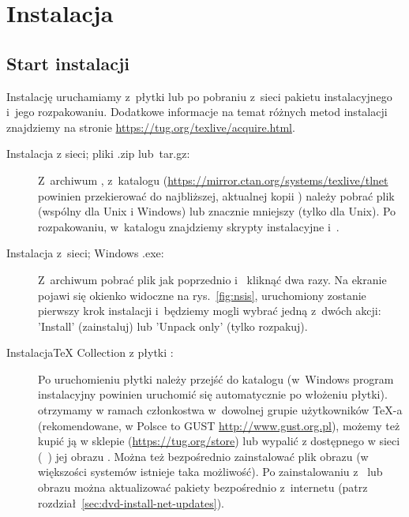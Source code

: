 \documentclass{article}
\begin{document}
\section{Instalacja}
\label{sec:install}

\subsection{Start instalacji}
\label{sec:inst-start}

Instalację \TL{} uruchamiamy z~płytki \TK{} \DVD{} lub po pobraniu z~sieci
pakietu instalacyjnego i~jego rozpakowaniu.
Dodatkowe informacje na temat różnych metod instalacji znajdziemy
na stronie \url{https://tug.org/texlive/acquire.html}.

\begin{description}
\item [Instalacja z sieci; pliki .zip lub~tar.gz:] Z~archiwum \CTAN, z~katalogu
(\url{https://mirror.ctan.org/systems/texlive/tlnet} powinien
przekierować do najbliższej, aktualnej kopii \CTAN) należy pobrać plik
 (wspólny dla Unix i Windows) lub znacznie mniejszy
 (tylko dla Unix). Po rozpakowaniu,
w~katalogu  znajdziemy skrypty instalacyjne
 i~.

\item [Instalacja z~sieci; Windows .exe:]
Z~archiwum \CTAN{}   pobrać plik jak poprzednio i~ kliknąć dwa razy. Na ekranie pojawi się okienko  widoczne na rys.~\ref{fig:nsis},  uruchomiony zostanie pierwszy krok instalacji  i~będziemy mogli wybrać jedną z~dwóch akcji: 'Install' (zainstaluj) lub 'Unpack only' (tylko rozpakuj).


\item [Instalacja\TeX{} Collection z płytki  \DVD:] Po uruchomieniu
płytki należy przejść do katalogu    \DVD{}
(w~Windows program instalacyjny powinien uruchomić się  automatycznie po włożeniu płytki).
\DVD{} otrzymamy w ramach członkostwa w~dowolnej grupie użytkowników
  \TeX-a (rekomendowane, w Polsce to GUST  \url{http://www.gust.org.pl}), możemy też kupić ją  w sklepie (\url{https://tug.org/store})
 lub  wypalić  z dostępnego w sieci (\CTAN\ ) jej obrazu \ISO{}. Można też 
bezpośrednio zainstalować plik obrazu (w większości systemów istnieje taka możliwość). Po
zainstalowaniu z \DVD\ lub obrazu \ISO{} można aktualizować pakiety
bezpośrednio z~internetu (patrz rozdział~\ref{sec:dvd-install-net-updates}).
\end{description}
\end{document}
